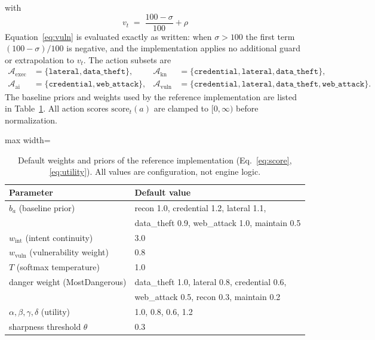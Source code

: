 \documentclass[preprints,article,accept,oneauthor]{Definitions/mdpi}
\newcommand{\act}[1]{\texttt{#1}}
\begin{document}
with
\begin{equation}
v_t \;=\; \frac{100-\sigma}{100} + \rho
\label{eq:vuln}
\end{equation}
Equation~\ref{eq:vuln} is evaluated exactly as written: when $\sigma>100$
the first term $(100-\sigma)/100$ is negative, and the implementation
applies no additional guard or extrapolation to $v_t$. The action subsets are
\[
\begin{aligned}
\mathcal{A}_{\mathrm{exec}} &= \{\act{lateral}, \act{data\_theft}\}, &
\mathcal{A}_{\mathrm{kn}} &= \{\act{credential}, \act{lateral}, \act{data\_theft}\},\\
\mathcal{A}_{\mathrm{ai}} &= \{\act{credential}, \act{web\_attack}\}, &
\mathcal{A}_{\mathrm{vuln}} &= \{\act{credential}, \act{lateral}, \act{data\_theft}, \act{web\_attack}\}.
\end{aligned}
\]
The baseline priors and weights used by the reference implementation are
listed in Table~\ref{tab:params}. All action scores
$\mathrm{score}_t(a)$ are clamped to $[0,\infty)$ before normalization.

\begin{table}[ht]
\centering
\begin{adjustbox}{max width=\linewidth}\begin{tabular}{@{}ll@{}}
\toprule
\textbf{Parameter} & \textbf{Default value} \\
\midrule
$b_a$ (baseline prior) & recon 1.0, credential 1.2, lateral 1.1, \\
 & data\_theft 0.9, web\_attack 1.0, maintain 0.5 \\
$w_{\mathrm{int}}$ (intent continuity) & 3.0 \\
$w_{\mathrm{vuln}}$ (vulnerability weight) & 0.8 \\
$T$ (softmax temperature) & 1.0 \\
danger weight (MostDangerous) & data\_theft 1.0, lateral 0.8, credential 0.6, \\
 & web\_attack 0.5, recon 0.3, maintain 0.2 \\
$\alpha,\beta,\gamma,\delta$ (utility) & 1.0, 0.8, 0.6, 1.2 \\
sharpness threshold $\theta$ & 0.3 \\
\bottomrule
\end{tabular}\end{adjustbox}
\caption{Default weights and priors of the reference implementation
(Eq.~\ref{eq:score}, \ref{eq:utility}). All values are configuration, not
engine logic.}
\label{tab:params}
\end{table}
\end{document}
